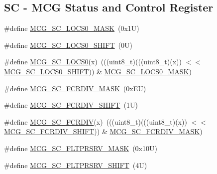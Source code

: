 \subsection*{SC -\/ M\+CG Status and Control Register}
\begin{DoxyCompactItemize}
\item 
\#define \mbox{\hyperlink{group___m_c_g___register___masks_ga9a57acb821c7622eb2b25e6c7daf7e16}{M\+C\+G\+\_\+\+S\+C\+\_\+\+L\+O\+C\+S0\+\_\+\+M\+A\+SK}}~(0x1\+U)
\item 
\#define \mbox{\hyperlink{group___m_c_g___register___masks_ga2a80b0f354602d5da8426e9d2b51ea12}{M\+C\+G\+\_\+\+S\+C\+\_\+\+L\+O\+C\+S0\+\_\+\+S\+H\+I\+FT}}~(0\+U)
\item 
\#define \mbox{\hyperlink{group___m_c_g___register___masks_gab831af7e9fb430b45af114e428c811c3}{M\+C\+G\+\_\+\+S\+C\+\_\+\+L\+O\+C\+S0}}(x)~(((uint8\+\_\+t)(((uint8\+\_\+t)(x)) $<$$<$ \mbox{\hyperlink{group___m_c_g___register___masks_ga2a80b0f354602d5da8426e9d2b51ea12}{M\+C\+G\+\_\+\+S\+C\+\_\+\+L\+O\+C\+S0\+\_\+\+S\+H\+I\+FT}})) \& \mbox{\hyperlink{group___m_c_g___register___masks_ga9a57acb821c7622eb2b25e6c7daf7e16}{M\+C\+G\+\_\+\+S\+C\+\_\+\+L\+O\+C\+S0\+\_\+\+M\+A\+SK}})
\item 
\#define \mbox{\hyperlink{group___m_c_g___register___masks_ga9b5d58f2f0a68eabe93f088dc2f81d2b}{M\+C\+G\+\_\+\+S\+C\+\_\+\+F\+C\+R\+D\+I\+V\+\_\+\+M\+A\+SK}}~(0x\+E\+U)
\item 
\#define \mbox{\hyperlink{group___m_c_g___register___masks_gacc99cc05a01e5807395bfe11518b26e3}{M\+C\+G\+\_\+\+S\+C\+\_\+\+F\+C\+R\+D\+I\+V\+\_\+\+S\+H\+I\+FT}}~(1\+U)
\item 
\#define \mbox{\hyperlink{group___m_c_g___register___masks_ga50a0225002267599fa7a2fc341fa783a}{M\+C\+G\+\_\+\+S\+C\+\_\+\+F\+C\+R\+D\+IV}}(x)~(((uint8\+\_\+t)(((uint8\+\_\+t)(x)) $<$$<$ \mbox{\hyperlink{group___m_c_g___register___masks_gacc99cc05a01e5807395bfe11518b26e3}{M\+C\+G\+\_\+\+S\+C\+\_\+\+F\+C\+R\+D\+I\+V\+\_\+\+S\+H\+I\+FT}})) \& \mbox{\hyperlink{group___m_c_g___register___masks_ga9b5d58f2f0a68eabe93f088dc2f81d2b}{M\+C\+G\+\_\+\+S\+C\+\_\+\+F\+C\+R\+D\+I\+V\+\_\+\+M\+A\+SK}})
\item 
\#define \mbox{\hyperlink{group___m_c_g___register___masks_ga1eea80f4646116c2ca2a68aa3469436a}{M\+C\+G\+\_\+\+S\+C\+\_\+\+F\+L\+T\+P\+R\+S\+R\+V\+\_\+\+M\+A\+SK}}~(0x10\+U)
\item 
\#define \mbox{\hyperlink{group___m_c_g___register___masks_gac75a3cb915913ba4acc64a098bba4eb5}{M\+C\+G\+\_\+\+S\+C\+\_\+\+F\+L\+T\+P\+R\+S\+R\+V\+\_\+\+S\+H\+I\+FT}}~(4\+U)

\end{DoxyCompactItemize}
